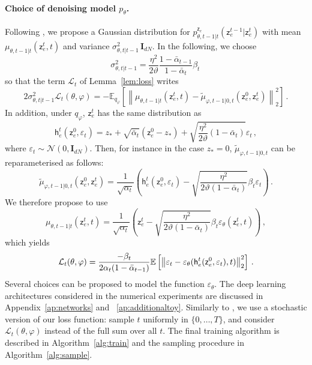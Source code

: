 \documentclass{article}
\theoremstyle{plain}
\theoremstyle{definition}
\theoremstyle{remark}
\newcommand{\latentcont}{\mathsf{z}_e}
\newcommand{\latentcontpred}{\mathsf{h}_e}
\begin{document}
\paragraph{Choice of denoising model $p_\theta$.}
Following \cite{ho2020denoising}, we propose a Gaussian distribution for $p_{\theta,t-1|t}^{\latentcont}(\latentcont^{t-1}|\latentcont^{t})$ with mean $\mu_{\theta,t-1|t}(\latentcont^{t},t)$ and variance $\sigma_{\theta,t|t-1}^2\,\mathbf{I}_{dN}$. In the following, we choose $$
\sigma_{\theta,t|t-1}^2 = \frac{\eta^2}{2\vartheta}\frac{1- \bar \alpha_{t-1}}{1- \bar \alpha_{t}}\beta_t\,
$$
so that the term $\mathcal{L}_t$ of Lemma~\ref{lem:loss} writes
$$
    2\sigma_{\theta,t|t-1}^2\mathcal{L}_t(\theta,\varphi)   = -\mathbb{E}_{q_\varphi}\left[\left\|\mu_{\theta,t-1|t}(\latentcont^{t},t) -  \tilde \mu_{\varphi,t-1|0,t}(\latentcont^0,\latentcont^t)\right\|_2^2\right]\,.
$$
In addition, under $q_\varphi$, $\latentcont^t$ has the same distribution as
$$
\latentcontpred^t(\latentcont^{0},\varepsilon_t) = z_* + \sqrt{\bar \alpha_t}(\latentcont^{0}-z_*) + \sqrt{\frac{\eta^2}{2\vartheta}(1-\bar\alpha_t)}\varepsilon_t\,,
$$
where $\varepsilon_t \sim \mathcal{N}(0,\mathbf{I}_{dN})$. Then, for instance in the case $z_*=0$, $\tilde \mu_{\varphi,t-1|0,t}$ can be reparameterised as follows:
$$
    \tilde \mu_{\varphi,t-1|0,t}(\latentcont^0,\latentcont^t) =  \frac{1}{\sqrt{\alpha_t}}\left(\latentcontpred^t(\latentcont^0,\varepsilon_t) - \sqrt{\frac{\eta^2}{2\vartheta (1-\bar{\alpha}_t)}}\beta_t\varepsilon_t\right)\,.
$$
We therefore propose to use
$$
    \mu_{\theta,t-1|t}(\latentcont^{t},t) =
     \frac{1}{\sqrt{\alpha_t}}\left(\latentcont^t - \sqrt{\frac{\eta^2}{2\vartheta (1-\bar{\alpha}_t)}}\beta_t\varepsilon_\theta(\latentcont^{t},t)\right)\,,
$$
which yields
\begin{equation}
    \label{eq:hoparam}
    \mathcal{L}_t(\theta,\varphi) \\
    = \frac{-\beta_t}{2\alpha_t(1-\bar\alpha_{t-1})}\mathbb{E}\left[\left\|\varepsilon_t - \varepsilon_\theta(\latentcontpred^t(\latentcont^{0},\varepsilon_t) ,t) \right\|_2^2\right]\,.
\end{equation}
Several choices can be proposed to model the function $\varepsilon_\theta$. The deep learning architectures considered in the numerical experiments are discussed in Appendix~\ref{ap:networks} and ~\ref{ap:additionaltoy}. Similarly to \cite{ho2020denoising}, we use a stochastic version of our loss function:  sample $t$ uniformly in $\{0, \ldots,  T\}$, and consider $\mathcal{L}_t(\theta,\varphi)$ instead of the full sum over all $t$. The final training algorithm is described in Algorithm~\ref{alg:train} and the sampling procedure in Algorithm~\ref{alg:sample}. 
\end{document}
